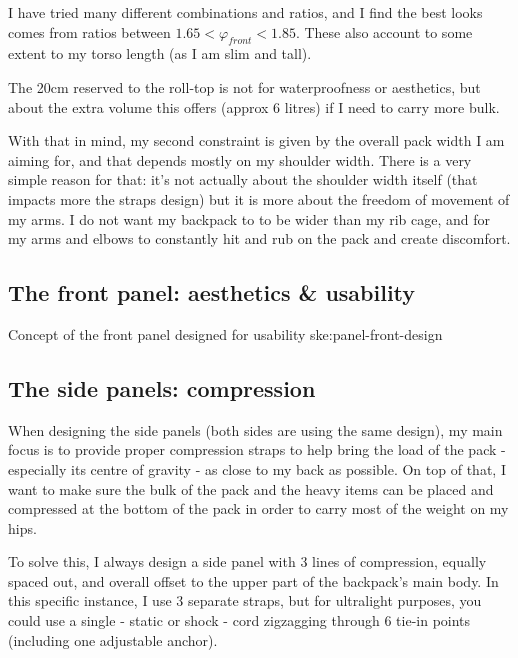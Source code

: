 I have tried many different combinations and ratios, and I find the best looks comes from ratios between $1.65 < \varphi_{front} < 1.85$. These also account to some extent to my torso length (as I am slim and tall).

\begin{note}
  The 20cm reserved to the roll-top is not for waterproofness or aesthetics, but about the extra volume this offers (approx 6 litres) if I need to carry more bulk.
\end{note}

With that in mind, my second constraint is given by the overall pack width I am aiming for, and that depends mostly on my shoulder width. There is a very simple reason for that: it's not actually about the shoulder width itself (that impacts more the straps design) but it is more about the freedom of movement of my arms. I do not want my backpack to to be wider than my rib cage, and for my arms and elbows to constantly hit and rub on the pack and create discomfort.

\subsection{The front panel: aesthetics \& usability}

{Concept of the front panel designed for usability}
{ske:panel-front-design}

\subsection{The side panels: compression}

When designing the side panels (both sides are using the same design), my main focus is to provide proper compression straps to help bring the load of the pack - especially its centre of gravity - as close to my back as possible. On top of that, I want to make sure the bulk of the pack and the heavy items can be placed and compressed at the bottom of the pack in order to carry most of the weight on my hips.

To solve this, I always design a side panel with 3 lines of compression, equally spaced out, and overall offset to the upper part of the backpack's main body. In this specific instance, I use 3 separate straps, but for ultralight purposes, you could use a single - static or shock - cord zigzagging through 6 tie-in points (including one adjustable anchor).

